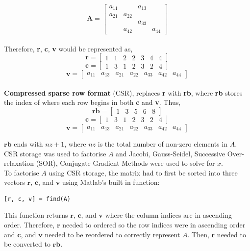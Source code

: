 \documentclass[12pt,a4paper]{article}
\begin{document}
$$
\textbf{A} = \begin{bmatrix}
a_{11} & & a_{13} &\\
a_{21} & a_{22} & &\\
& & a_{33} & \\
& a_{42} & & a_{44}
\end{bmatrix}
$$
\\
Therefore, \textbf{r}, \textbf{c}, \textbf{v} would be represented as, 
$$
\textbf{r} = \begin{bmatrix}
1 & 1 & 2 & 2 & 3 & 4 & 4 
\end{bmatrix}
$$
$$
\textbf{c} = \begin{bmatrix}
1 & 3 & 1 & 2 & 3 & 2 & 4
\end{bmatrix}
$$
$$
\textbf{v} = \begin{bmatrix}
a_{11} & a_{13} & a_{21} & a_{22} & a_{33} & a_{42} & a_{44}
\end{bmatrix}
$$
\\
\textbf{Compressed sparse row format} (CSR), replaces \textbf{r} with \textbf{rb}, where \textbf{rb} stores the index of where each row begins in both \textbf{c} and \textbf{v}. Thus,
$$
\textbf{rb} = \begin{bmatrix}
1 & 3 & 5 & 6 & 8
\end{bmatrix}
$$
$$
\textbf{c} = \begin{bmatrix}
1 & 3 & 1 & 2 & 3 & 2 & 4
\end{bmatrix}
$$
$$
\textbf{v} = \begin{bmatrix}
a_{11} & a_{13} & a_{21} & a_{22} & a_{33} & a_{42} & a_{44}
\end{bmatrix}
$$

$\textbf{rb}$ ends with $nz + 1$, where $nz$ is the total number of non-zero elements in $A$.
\\
CSR storage was used to factorise $A$ and Jacobi, Gauss-Seidel, Successive Over-relaxation (SOR), Conjugate Gradient Methods were used to solve for $x$.
\\
To factorise $A$ using CSR storage, the matrix had to first be sorted into three vectors $\textbf{r}$, $\textbf{c}$, and $\textbf{v}$ using Matlab's built in function: 
\begin{verbatim} 
[r, c, v] = find(A) 
\end{verbatim}
This function returns $\textbf{r}$, $\textbf{c}$, and $\textbf{v}$ where the column indices are in ascending order. Therefore, $\textbf{r}$ needed to ordered so the row indices were in ascending order and $\textbf{c}$, and $\textbf{v}$ needed to be reordered to correctly represent $A$. Then, $\textbf{r}$ needed to be converted to $\textbf{rb}$.
\end{document}
